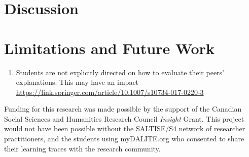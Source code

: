 \documentclass[sigconf]{acmart}
\begin{document}
\section{Discussion}

\section{Limitations and Future Work}
\begin{enumerate}
	\item Students are not explicitly directed on how to evaluate their peers' 
	explanations. This may have an impact 
	 \url{https://link.springer.com/article/10.1007/s10734-017-0220-3}
\end{enumerate}

\begin{acks}
Funding for this research was made possible by the support of the Canadian 
Social Sciences and Humanities Research Council \textit{Insight} Grant. This 
project would not have been possible without the SALTISE/S4 network of 
researcher practitioners, and the students using myDALITE.org who consented to 
share their learning traces with the research community.
\end{acks}



\end{document}
